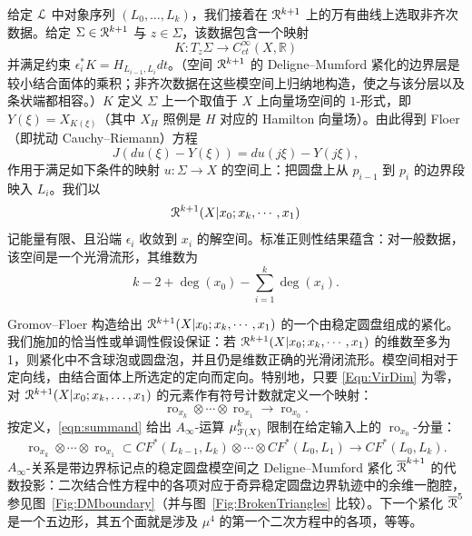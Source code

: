 \documentclass[11pt,a4paper]{article}
\numberwithin{equation}{section}
\newcommand{\bR}{\mathbb{R}}
\newcommand{\scrL}{\EuScript{L}}
\newcommand{\scrF}{\EuScript{F}}
\newcommand{\scrR}{\EuScript{R}}
\newcommand{\ro}{\operatorname{ro}}
\begin{document}
给定 $\scrL$ 中对象序列 $(L_0, \ldots, L_k)$，我们接着在 $\scrR^{k+1}$ 上的万有曲线上选取非齐次数据。给定 $\Sigma \in \scrR^{k+1}$ 与 $z \in \Sigma$，该数据包含一个映射
\begin{equation}
  K : T_{z} \Sigma \to C^{\infty}_{ct}(X, \bR)
\end{equation}
并满足约束 $\epsilon_i^* K = H_{L_{i-1},L_{i}} dt$。（空间 $\scrR^{k+1}$ 的 Deligne--Mumford 紧化的边界层是较小结合面体的乘积；非齐次数据在这些模空间上归纳地构造，使之与该分层以及条状端都相容。）$K$ 定义 $\Sigma$ 上一个取值于 $X$ 上向量场空间的 $1$-形式，即 $Y(\xi) = X_{K(\xi)}$（其中 $X_H$ 照例是 $H$ 对应的 Hamilton 向量场）。由此得到 Floer（即扰动 Cauchy--Riemann）方程
\begin{equation} \label{eq:Floer_equation_0-puncture}
 J \left( du(\xi) - Y(\xi)  \right) = du(j \xi) - Y(j \xi) ,
\end{equation}
作用于满足如下条件的映射 $u: \Sigma \to X$ 的空间上：把圆盘上从 $p_{i-1}$ 到 $p_{i}$ 的边界段映入 $L_i$。我们以
\[
  \scrR^{k+1}(X | x_0; x_k ,\cdots, x_1)
\]
记能量有限、且沿端 $\epsilon_i$ 收敛到 $x_i$ 的解空间。标准正则性结果蕴含：对一般数据，该空间是一个光滑流形，其维数为
\begin{equation} \label{Eqn:VirDim}
k - 2 +  \deg(x_0) - \sum_{i=1}^k \deg(x_i).
\end{equation}

Gromov--Floer 构造给出 $  \scrR^{k+1}(X| x_0; x_k ,\cdots, x_1 )  $ 的一个由稳定圆盘组成的紧化。我们施加的恰当性或单调性假设保证：若 $\scrR^{k+1}(X | x_0; x_k ,\cdots, x_1)$ 的维数至多为 1，则紧化中不含球泡或圆盘泡，并且仍是维数正确的光滑闭流形。模空间相对于定向线，由结合面体上所选定的定向而定向。特别地，只要 \eqref{Eqn:VirDim} 为零，对 $  \scrR^{k+1}(X|x_0; x_k, \ldots, x_1) $ 的元素作有符号计数就定义一个映射：
\begin{equation} \label{eqn:summand}
   \ro_{x_k} \otimes  \cdots \otimes \ro_{x_1} \to \ro_{x_0}.  
\end{equation}
按定义，\eqref{eqn:summand} 给出 $A_{\infty}$-运算 $\mu_{\scrF(X)}^k$ 限制在给定输入上的 $\ro_{x_0}$-分量：
\begin{equation}
   \ro_{x_k} \otimes  \cdots \otimes \ro_{x_1}  \subset CF^*(L_{k-1}, L_k) \otimes \cdots \otimes CF^*(L_{0}, L_1)  \to CF^*(L_{0}, L_k).
\end{equation}
$A_{\infty}$-关系是带边界标记点的稳定圆盘模空间之 Deligne--Mumford 紧化 $\overline{\scrR}^{k+1}$ 的代数投影：二次结合性方程中的各项对应于奇异稳定圆盘边界轨迹中的余维一胞腔，参见图~\ref{Fig:DMboundary}（并与图~\ref{Fig:BrokenTriangles} 比较）。下一个紧化 $\overline{\scrR}^{5}$ 是一个五边形，其五个面就是涉及 $\mu^4$ 的第一个二次方程中的各项，等等。
\end{document}
